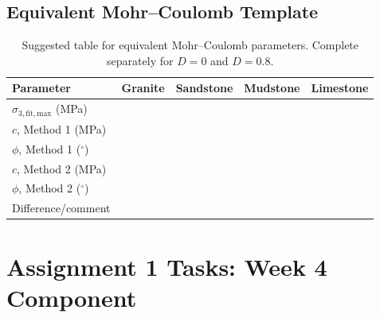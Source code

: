 \documentclass[a4paper,12pt]{article}
\begin{document}
\subsection{Equivalent Mohr--Coulomb Template}

\begin{table}[H]
\centering
\small
\begin{tabularx}{0.95\textwidth}{l c c c c}
\toprule
\textbf{Parameter} & \textbf{Granite} & \textbf{Sandstone} & \textbf{Mudstone} & \textbf{Limestone} \\
\midrule
\(\sigma_{3,\mathrm{fit,max}}\) (MPa) & & & & \\
\(c\), Method 1 (MPa) & & & & \\
\(\phi\), Method 1 (\(^\circ\)) & & & & \\
\(c\), Method 2 (MPa) & & & & \\
\(\phi\), Method 2 (\(^\circ\)) & & & & \\
Difference/comment & & & & \\
\bottomrule
\end{tabularx}
\caption{Suggested table for equivalent Mohr--Coulomb parameters. Complete separately for \(D=0\) and \(D=0.8\).}
\label{tab:mc_template}
\end{table}

\section{Assignment 1 Tasks: Week 4 Component}
\end{document}
